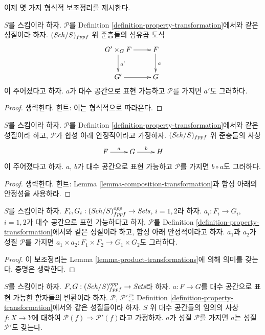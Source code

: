 \medskip\noindent
이제 몇 가지 형식적 보조정리를 제시한다.

\begin{lemma}
\label{lemma-base-change-transformation-property}
$S$를 스킴이라 하자. $\mathcal{P}$를
Definition \ref{definition-property-transformation}에서와 같은 성질이라
하자. $(\mathit{Sch}/S)_{fppf}$ 위 준층들의 섬유곱 도식
$$
\xymatrix{
G' \times_G F \ar[r] \ar[d]^{a'} & F \ar[d]^a \\
G' \ar[r] & G
}
$$
이 주어졌다고 하자. $a$가 대수 공간으로 표현 가능하고
$\mathcal{P}$를 가지면 $a'$도 그러하다.
\end{lemma}

\begin{proof}
생략한다. 힌트: 이는 형식적으로 따라온다.
\end{proof}

\begin{lemma}
\label{lemma-composition-transformation-property}
$S$를 스킴이라 하자. $\mathcal{P}$를
Definition \ref{definition-property-transformation}에서와 같은 성질이라
하고, $\mathcal{P}$가 합성 아래 안정적이라고 가정하자.
$(\mathit{Sch}/S)_{fppf}$ 위 준층들의 사상
$$
\xymatrix{
F \ar[r]^a & G \ar[r]^b & H
}
$$
이 주어졌다고 하자. $a$, $b$가 대수 공간으로 표현 가능하고
$\mathcal{P}$를 가지면 $b \circ a$도 그러하다.
\end{lemma}

\begin{proof}
생략한다. 힌트: Lemma \ref{lemma-composition-transformation}과 합성 아래의
안정성을 사용하라.
\end{proof}

\begin{lemma}
\label{lemma-product-transformations-property}
$S$를 스킴이라 하자.
$F_i, G_i : (\mathit{Sch}/S)_{fppf}^{opp} \to \textit{Sets}$, $i = 1, 2$라 하자.
$a_i : F_i \to G_i$, $i = 1, 2$가 대수 공간으로 표현 가능하다고 하자.
$\mathcal{P}$를 Definition \ref{definition-property-transformation}에서와
같은 성질이라 하고, 합성 아래 안정적이라고 하자. $a_1$과 $a_2$가
성질 $\mathcal{P}$를 가지면
$a_1 \times a_2 : F_1 \times F_2 \longrightarrow G_1 \times G_2$도
그러하다.
\end{lemma}

\begin{proof}
이 보조정리는 Lemma \ref{lemma-product-transformations}에 의해 의미를
갖는다. 증명은 생략한다.
\end{proof}

\begin{lemma}
\label{lemma-transformations-property-implication}
$S$를 스킴이라 하자.
$F, G : (\mathit{Sch}/S)_{fppf}^{opp} \to \textit{Sets}$라 하자.
$a : F \to G$를 대수 공간으로 표현 가능한 함자들의 변환이라 하자.
$\mathcal{P}$, $\mathcal{P}'$를
Definition \ref{definition-property-transformation}에서와 같은 성질들이라
하자. $S$ 위 대수 공간들의 임의의 사상 $f : X \to Y$에 대하여
$\mathcal{P}(f) \Rightarrow \mathcal{P}'(f)$라고 가정하자.
$a$가 성질 $\mathcal{P}$를 가지면 $a$는 성질 $\mathcal{P}'$도 갖는다.
\end{lemma}

